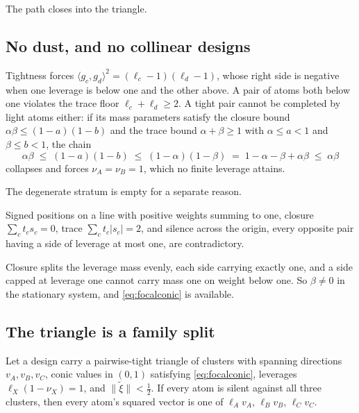 The path closes into the triangle.

\subsection{No dust, and no collinear designs}\label{app:nodust}

Tightness forces $\langle g_c,g_d\rangle^2=(\ell_c-1)(\ell_d-1)$, whose
right side is negative when one leverage is below one and the other above.
A pair of atoms both below one violates the trace floor
$\ell_c+\ell_d\ge2$.  A tight pair cannot be completed by light atoms
either: if its mass parameters satisfy the closure bound
$\alpha\beta\le(1-a)(1-b)$ and the trace bound $\alpha+\beta\ge1$ with
$\alpha\le a<1$ and $\beta\le b<1$, the chain
\[
  \alpha\beta\;\le\;(1-a)(1-b)\;\le\;(1-\alpha)(1-\beta)
  \;=\;1-\alpha-\beta+\alpha\beta\;\le\;\alpha\beta
\]
collapses and forces $\nu_A=\nu_B=1$, which no finite leverage attains.

The degenerate stratum is empty for a separate reason.

\begin{proposition}[Lean]\label{prop:collinear}
Signed positions on a line with positive weights summing to one, closure
$\sum_ct_cs_c=0$, trace $\sum_ct_c\lvert s_c\rvert=2$, and silence across
the origin, every opposite pair having a side of leverage at most one, are
contradictory.
\end{proposition}

Closure splits the leverage mass evenly, each side carrying exactly one,
and a side capped at leverage one cannot carry mass one on weight below
one.  So $\beta\ne0$ in the stationary system, and \eqref{eq:focalconic}
is available.

\subsection{The triangle is a family split}\label{app:planarcomplete}

\begin{theorem}[Lean]\label{thm:planarcomplete}
Let a design carry a pairwise-tight triangle of clusters with spanning
directions $v_A,v_B,v_C$, conic values in $(0,1)$ satisfying
\eqref{eq:focalconic}, leverages $\ell_X(1-\nu_X)=1$, and
$\lVert\tilde\xi\rVert<\tfrac12$.  If every atom is silent against all
three clusters, then every atom's squared vector is one of
$\ell_Av_A$, $\ell_Bv_B$, $\ell_Cv_C$.
\end{theorem}

